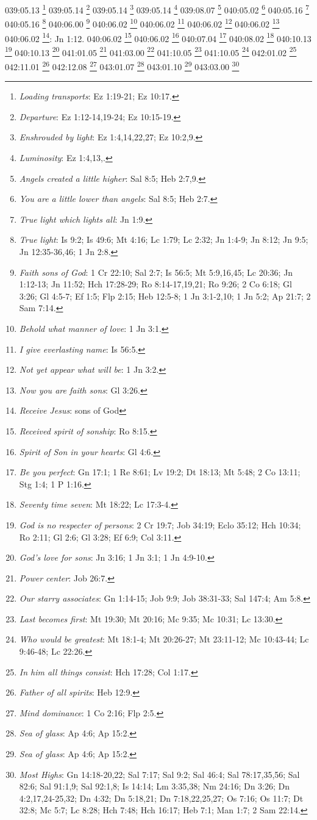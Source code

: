 {{{{{{{{{{{{{{{{{{{{{{{{039:05.13 \footnote{\textit{Loading transports}: Ez 1:19-21; Ez 10:17.}
039:05.14 \footnote{\textit{Departure}: Ez 1:12-14,19-24; Ez 10:15-19.}
039:05.14 \footnote{\textit{Enshrouded by light}: Ez 1:4,14,22,27; Ez 10:2,9.}
039:05.14 \footnote{\textit{Luminosity}: Ez 1:4,13,.}
039:08.07 \footnote{\textit{Angels created a little higher}: Sal 8:5; Heb 2:7,9.}
040:05.02 \footnote{\textit{You are a little lower than angels}: Sal 8:5; Heb 2:7.}
040:05.16 \footnote{\textit{True light which lights all}: Jn 1:9.}
040:05.16 \footnote{\textit{True light}: Is 9:2; Is 49:6; Mt 4:16; Lc 1:79; Lc 2:32; Jn 1:4-9; Jn 8:12; Jn 9:5; Jn 12:35-36,46; 1 Jn 2:8.}
040:06.00 \footnote{\textit{Faith sons of God}: 1 Cr 22:10; Sal 2:7; Is 56:5; Mt 5:9,16,45; Lc 20:36; Jn 1:12-13; Jn 11:52; Hch 17:28-29; Ro 8:14-17,19,21; Ro 9:26; 2 Co 6:18; Gl 3:26; Gl 4:5-7; Ef 1:5; Flp 2:15; Heb 12:5-8; 1 Jn 3:1-2,10; 1 Jn 5:2; Ap 21:7; 2 Sam 7:14.}
040:06.02 \footnote{\textit{Behold what manner of love}: 1 Jn 3:1.}
040:06.02 \footnote{\textit{I give everlasting name}: Is 56:5.}
040:06.02 \footnote{\textit{Not yet appear what will be}: 1 Jn 3:2.}
040:06.02 \footnote{\textit{Now you are faith sons}: Gl 3:26.}
040:06.02 \footnote{\textit{Receive Jesus}: sons of God}: Jn 1:12.}
040:06.02 \footnote{\textit{Received spirit of sonship}: Ro 8:15.}
040:06.02 \footnote{\textit{Spirit of Son in your hearts}: Gl 4:6.}
040:07.04 \footnote{\textit{Be you perfect}: Gn 17:1; 1 Re 8:61; Lv 19:2; Dt 18:13; Mt 5:48; 2 Co 13:11; Stg 1:4; 1 P 1:16.}
040:08.02 \footnote{\textit{Seventy time seven}: Mt 18:22; Lc 17:3-4.}
040:10.13 \footnote{\textit{God is no respecter of persons}: 2 Cr 19:7; Job 34:19; Eclo 35:12; Hch 10:34; Ro 2:11; Gl 2:6; Gl 3:28; Ef 6:9; Col 3:11.}
040:10.13 \footnote{\textit{God's love for sons}: Jn 3:16; 1 Jn 3:1; 1 Jn 4:9-10.}
041:01.05 \footnote{\textit{Power center}: Job 26:7.}
041:03.00 \footnote{\textit{Our starry associates}: Gn 1:14-15; Job 9:9; Job 38:31-33; Sal 147:4; Am 5:8.}
041:10.05 \footnote{\textit{Last becomes first}: Mt 19:30; Mt 20:16; Mc 9:35; Mc 10:31; Lc 13:30.}
041:10.05 \footnote{\textit{Who would be greatest}: Mt 18:1-4; Mt 20:26-27; Mt 23:11-12; Mc 10:43-44; Lc 9:46-48; Lc 22:26.}
042:01.02 \footnote{\textit{In him all things consist}: Hch 17:28; Col 1:17.}
042:11.01 \footnote{\textit{Father of all spirits}: Heb 12:9.}
042:12.08 \footnote{\textit{Mind dominance}: 1 Co 2:16; Flp 2:5.}
043:01.07 \footnote{\textit{Sea of glass}: Ap 4:6; Ap 15:2.}
043:01.10 \footnote{\textit{Sea of glass}: Ap 4:6; Ap 15:2.}
043:03.00 \footnote{\textit{Most Highs}: Gn 14:18-20,22; Sal 7:17; Sal 9:2; Sal 46:4; Sal 78:17,35,56; Sal 82:6; Sal 91:1,9; Sal 92:1,8; Is 14:14; Lm 3:35,38; Nm 24:16; Dn 3:26; Dn 4:2,17,24-25,32; Dn 4:32; Dn 5:18,21; Dn 7:18,22,25,27; Os 7:16; Os 11:7; Dt 32:8; Mc 5:7; Lc 8:28; Hch 7:48; Hch 16:17; Heb 7:1; Man 1:7; 2 Sam 22:14.}
}}}}}}}}}}}}}}}}}}}}}}}
